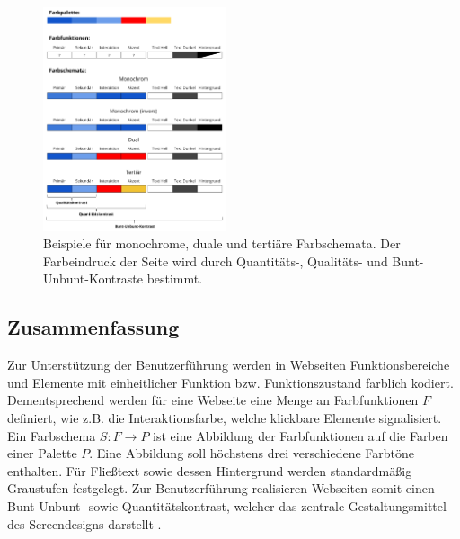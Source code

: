 \begin{figure}[h]
	\centering
	\includegraphics[width=0.48\textwidth]{img/colorschemes.png}
	\caption{Beispiele für monochrome, duale und tertiäre Farbschemata. Der Farbeindruck der Seite wird durch Quantitäts-, Qualitäts- und Bunt-Unbunt-Kontraste bestimmt.}
	\label{fig:colorschemes}
\end{figure}

\subsection*{Zusammenfassung}
Zur Unterstützung der Benutzerführung werden in Webseiten Funktionsbereiche und Elemente mit einheitlicher Funktion bzw. Funktionszustand farblich kodiert. Dementsprechend werden für eine Webseite eine Menge an Farbfunktionen $F$ definiert, wie z.B. die Interaktionsfarbe, welche klickbare Elemente signalisiert. Ein Farbschema $S: F \to P$ ist eine Abbildung der Farbfunktionen auf die Farben einer Palette $P$. Eine Abbildung soll höchstens drei verschiedene Farbtöne enthalten. Für Fließtext sowie dessen Hintergrund werden standardmäßig Graustufen festgelegt. Zur Benutzerführung realisieren Webseiten somit einen Bunt-Unbunt- sowie Quantitätskontrast, welcher das zentrale Gestaltungsmittel des Screendesigns darstellt \citep{webdesign, webx0}.
